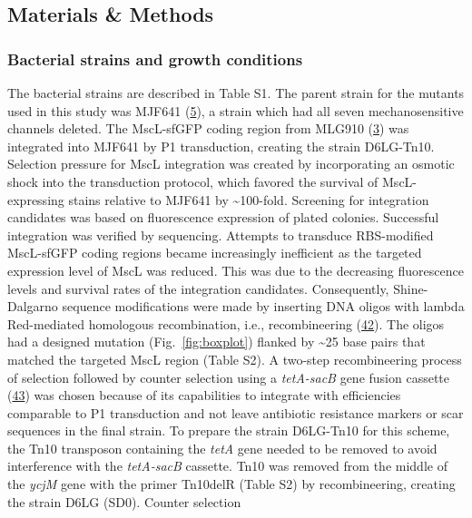 \subsection{Materials
\&
Methods}\label{materials-methods}

\subsubsection{Bacterial
strains
and
growth
conditions}\label{bacterial-strains-and-growth-conditions}

The
bacterial
strains
are
described
in
Table
S1.
The
parent
strain
for
the
mutants
used
in
this
study
was
MJF641
(\protect\hyperlink{ref-edwards2012}{5}),
a
strain
which
had
all
seven
mechanosensitive
channels
deleted.
The
MscL-sfGFP
coding
region
from
MLG910
(\protect\hyperlink{ref-bialecka-fornal2012}{3})
was
integrated
into
MJF641
by P1
transduction,
creating
the
strain
D6LG-Tn10.
Selection
pressure
for
MscL
integration
was
created
by
incorporating
an
osmotic
shock
into
the
transduction
protocol,
which
favored
the
survival
of
MscL-expressing
stains
relative
to
MJF641
by
\textasciitilde{}100-fold.
Screening
for
integration
candidates
was
based
on
fluorescence
expression
of
plated
colonies.
Successful
integration
was
verified
by
sequencing.
Attempts
to
transduce
RBS-modified
MscL-sfGFP
coding
regions
became
increasingly
inefficient
as the
targeted
expression
level
of
MscL
was
reduced.
This
was
due to
the
decreasing
fluorescence
levels
and
survival
rates
of the
integration
candidates.
Consequently,
Shine-Dalgarno
sequence
modifications
were
made
by
inserting
DNA
oligos
with
lambda
Red-mediated
homologous
recombination,
i.e.,
recombineering
(\protect\hyperlink{ref-sharan2009}{42}).
The
oligos
had a
designed
mutation
(Fig.~\ref{fig:boxplot})
flanked
by
\textasciitilde{}25
base
pairs
that
matched
the
targeted
MscL
region
(Table
S2). A
two-step
recombineering
process
of
selection
followed
by
counter
selection
using
a
\emph{tetA-sacB}
gene
fusion
cassette
(\protect\hyperlink{ref-li2013}{43})
was
chosen
because
of its
capabilities
to
integrate
with
efficiencies
comparable
to P1
transduction
and
not
leave
antibiotic
resistance
markers
or
scar
sequences
in the
final
strain.
To
prepare
the
strain
D6LG-Tn10
for
this
scheme,
the
Tn10
transposon
containing
the
\emph{tetA}
gene
needed
to be
removed
to
avoid
interference
with
the
\emph{tetA-sacB}
cassette.
Tn10
was
removed
from
the
middle
of the
\emph{ycjM}
gene
with
the
primer
Tn10delR
(Table
S2) by
recombineering,
creating
the
strain
D6LG
(SD0).
Counter
selection
